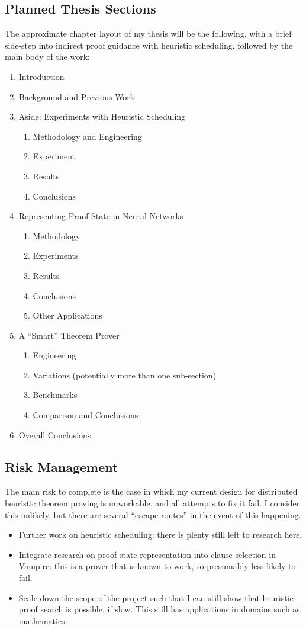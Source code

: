 \documentclass[a4paper, 10pt]{article}
\begin{document}
\subsection{Planned Thesis Sections}
The approximate chapter layout of my thesis will be the following, with a brief side-step into indirect proof guidance with heuristic scheduling, followed by the main body of the work:
\begin{enumerate}
	\item Introduction
	\item Background and Previous Work
	\item Aside: Experiments with Heuristic Scheduling
	\begin{enumerate}
		\item Methodology and Engineering
		\item Experiment
		\item Results
		\item Conclusions
	\end{enumerate}
	\item Representing Proof State in Neural Networks
	\begin{enumerate}
		\item Methodology
		\item Experiments
		\item Results
		\item Conclusions
		\item Other Applications
	\end{enumerate}
	\item A ``Smart'' Theorem Prover
	\begin{enumerate}
		\item Engineering
		\item Variations (potentially more than one sub-section)
		\item Benchmarks
		\item Comparison and Conclusions
	\end{enumerate}
	\item Overall Conclusions
\end{enumerate}

\subsection{Risk Management}
The main risk to complete is the case in which my current design for distributed heuristic theorem proving is unworkable, and all attempts to fix it fail.
I consider this unlikely, but there are several ``escape routes'' in the event of this happening.
\begin{itemize}
	\item Further work on heuristic scheduling: there is plenty still left to research here.
	\item Integrate research on proof state representation into clause selection in Vampire: this is a prover that is known to work, so presumably less likely to fail.
	\item Scale down the scope of the project such that I can still show that heuristic proof search is possible, if slow. This still has applications in domains such as mathematics.
\end{itemize}
\end{document}
